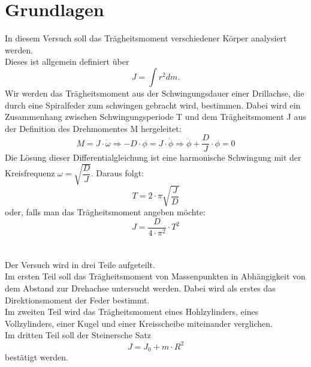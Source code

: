 \documentclass[12pt,a4paper]{article}
\begin{document}
\section{Grundlagen}
In diesem Versuch soll das Trägheitsmoment verschiedener Körper analysiert werden.\\
Dieses ist allgemein definiert über
\begin{equation}
J = \int r^2 dm.
\end{equation}
Wir werden das Trägheitsmoment aus der Schwingungsdauer einer Drillachse, die durch eine Spiralfeder zum schwingen gebracht wird, bestimmen. Dabei wird ein Zusammenhang zwischen Schwingungsperiode T und dem Trägheitsmoment J  aus der Definition des Drehmomentes M hergeleitet:
\begin{equation}
M = J\cdot \dot{\omega}\Rightarrow -D\cdot \phi = J\cdot \ddot{\phi}\Rightarrow \ddot{\phi} + \dfrac{D}{J}\cdot \phi = 0
\end{equation}
Die Lösung dieser Differentialgleichung ist eine harmonische Schwingung mit der Kreisfrequenz $\omega = \sqrt{\dfrac{D}{J}}$. Daraus folgt:
\begin{equation}
 T = 2\cdot \pi \sqrt{\dfrac{J}{D}}
\end{equation}
oder, falls man das Trägheitsmoment angeben möchte:
\begin{equation}
J = \dfrac{D}{4\cdot \pi^2}\cdot T^2
\end{equation}\\
\\
Der Versuch wird in drei Teile aufgeteilt.\\
Im ersten Teil soll das Trägheitsmoment von Massenpunkten in Abhängigkeit von dem Abstand zur Drehachse untersucht werden. Dabei wird als erstes das Direktionsmoment der Feder bestimmt.\\
Im zweiten Teil wird das Trägheitsmoment eines Hohlzylinders, eines Vollzylinders, einer Kugel und einer Kreisscheibe miteinander verglichen.\\
Im dritten Teil soll der Steinersche Satz
\begin{equation}
J = J_0+m \cdot R^2
\end{equation}
bestätigt werden.
\end{document}

